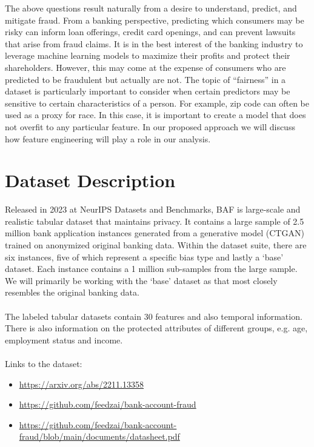 \documentclass{article}
\begin{document}
The above questions result naturally from a desire to understand, predict, and mitigate fraud. From a banking perspective, predicting which consumers may be risky can inform loan offerings, credit card openings, and can prevent lawsuits that arise from fraud claims. It is in the best interest of the banking industry to leverage machine learning models to maximize their profits and protect their shareholders. However, this may come at the expense of consumers who are predicted to be fraudulent but actually are not. The topic of “fairness” in a dataset is particularly important to consider when certain predictors may be sensitive to certain characteristics of a person. For example, zip code can often be used as a proxy for race. In this case, it is important to create a model that does not overfit to any particular feature. In our proposed approach we will discuss how feature engineering will play a role in our analysis. 

\section*{Dataset Description}

Released in 2023 at NeurIPS Datasets and Benchmarks, BAF is large-scale and realistic tabular dataset that maintains privacy. It contains a large sample of 2.5 million bank application instances generated from a generative model (CTGAN) trained on anonymized original banking data. Within the dataset suite, there are six instances, five of which represent a specific bias type and lastly a `base' dataset. Each instance contains a 1 million sub-samples from the large sample. We will primarily be working with the `base' dataset as that most closely resembles the original banking data.
\\
\\
The labeled tabular datasets contain 30 features and also temporal information. There is also information on the protected attributes of different groups, e.g. age, employment status and income.
\\
\\
Links to the dataset:
\begin{itemize}
    \item \href{https://arxiv.org/abs/2211.13358}{https://arxiv.org/abs/2211.13358}
    \item \href{https://github.com/feedzai/bank-account-fraud}{https://github.com/feedzai/bank-account-fraud}
    \item \href{https://github.com/feedzai/bank-account-fraud/blob/main/documents/datasheet.pdf}{https://github.com/feedzai/bank-account-fraud/blob/main/documents/datasheet.pdf}
\end{itemize}
\end{document}
